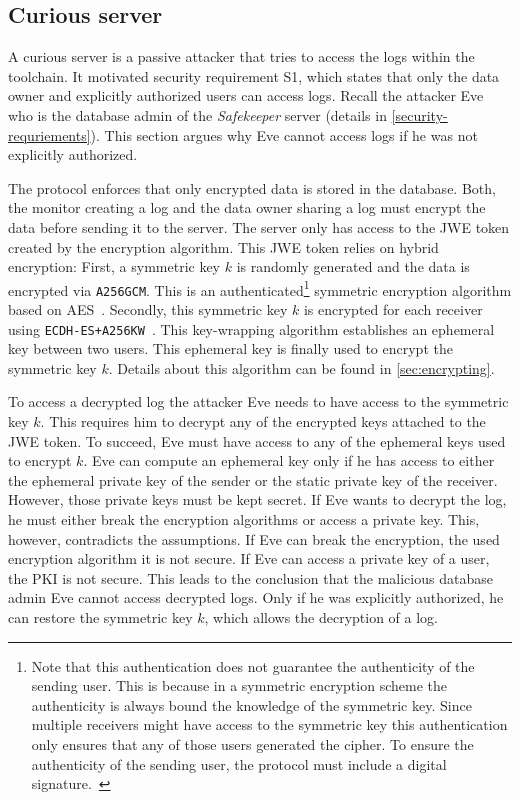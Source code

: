 \documentclass[../main.tex]{subfiles}
\begin{document}
\subsection{Curious server}
A curious server is a passive attacker that tries to access the logs within the toolchain.
It motivated security requirement S1, which states that only the data owner and explicitly authorized users can access logs.
Recall the attacker Eve who is the database admin of the \emph{Safekeeper} server (details in \cref{security-requriements}).
This section argues why Eve cannot access logs if he was not explicitly authorized.

The protocol enforces that only encrypted data is stored in the database.
Both, the monitor creating a log and the data owner sharing a log must encrypt the data before sending it to the server.
The server only has access to the JWE token created by the encryption algorithm.
This JWE token relies on hybrid encryption:
First, a symmetric key $k$ is randomly generated and the data is encrypted via \verb|A256GCM|.
This is an authenticated\footnote{Note that this authentication does not guarantee the authenticity of the sending user. This is because in a symmetric encryption scheme the authenticity is always bound the knowledge of the symmetric key. Since multiple receivers might have access to the symmetric key this authentication only ensures that any of those users generated the cipher. To ensure the authenticity of the sending user, the protocol must include a digital signature.~\cite[315]{Eckert2018}} symmetric encryption algorithm based on AES~\cite{JWA2015}.
Secondly, this symmetric key $k$ is encrypted for each receiver using \verb|ECDH-ES+A256KW|~\cite{JWA2015}.
This key-wrapping algorithm establishes an ephemeral key between two users.
This ephemeral key is finally used to encrypt the symmetric key $k$.
Details about this algorithm can be found in \cref{sec:encrypting}.

To access a decrypted log the attacker Eve needs to have access to the symmetric key $k$.
This requires him to decrypt any of the encrypted keys attached to the JWE token.
To succeed, Eve must have access to any of the ephemeral keys used to encrypt $k$.
Eve can compute an ephemeral key only if he has access to either the ephemeral private key of the sender or the static private key of the receiver.
However, those private keys must be kept secret.
If Eve wants to decrypt the log, he must either break the encryption algorithms or access a private key.
This, however, contradicts the assumptions.
If Eve can break the encryption, the used encryption algorithm it is not secure.
If Eve can access a private key of a user, the PKI is not secure.
This leads to the conclusion that the malicious database admin Eve cannot access decrypted logs.
Only if he was explicitly authorized, he can restore the symmetric key $k$, which allows the decryption of a log.
\end{document}
